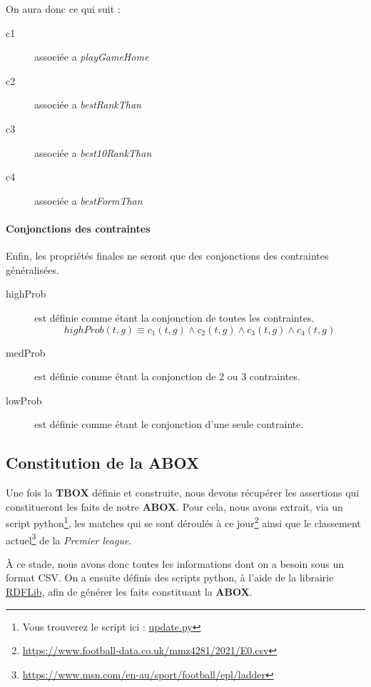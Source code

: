 \documentclass[oneside,13pt,a4paper]{article}
\begin{document}


On aura donc ce qui suit :
\begin{description}
  \item[c1] associée a \textit{playGameHome}
  \item[c2] associée a \textit{bestRankThan}
  \item[c3] associée a \textit{best10RankThan}
  \item[c4] associée a \textit{bestFormThan}
\end{description}

\paragraph{Conjonctions des contraintes}

Enfin, les propriétés finales ne seront que des conjonctions des contraintes généralisées.

\begin{description}
  \item[highProb] est définie comme étant la conjonction de toutes les contraintes. 
  \[highProb(t,g) \equiv c_1(t,g) \wedge c_2(t,g) \wedge c_3(t,g) \wedge c_4(t,g)\]
  \item[medProb] est définie comme étant la conjonction de 2 ou 3 contraintes.
  \item[lowProb] est définie comme étant le conjonction d'une seule contrainte.
\end{description}

\subsection{Constitution de la ABOX}

Une fois la \textbf{TBOX} définie et construite, nous devons récupérer les assertions qui constitueront les faits de notre \textbf{ABOX}. Pour cela, nous avons extrait, via un script python\footnote{Vous trouverez le script ici : \href{../db/update.py}{update.py}}, les matches qui se sont déroulés à ce jour\footnote{\url{https://www.football-data.co.uk/mmz4281/2021/E0.csv}} ainsi que le classement actuel\footnote{\url{https://www.msn.com/en-au/sport/football/epl/ladder}} de la \textit{Premier league}.

À ce stade, nous avons donc toutes les informations dont on a besoin sous un format CSV. On a ensuite définis des scripts python, à l'aide de la librairie \href{https://github.com/RDFLib/rdflib}{RDFLib}, afin de générer les faits constituant la \textbf{ABOX}.
\end{document}
